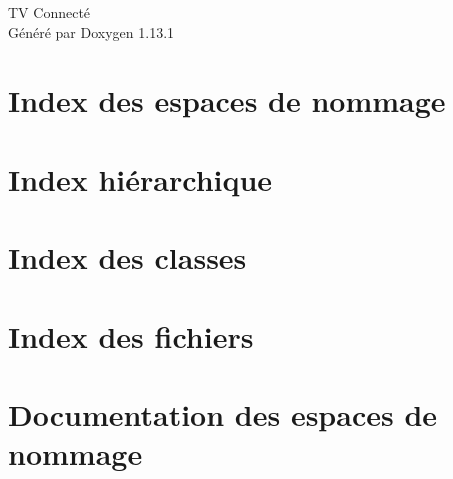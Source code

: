 \documentclass[twoside]{book}
\newcommand{\+}{\discretionary{\mbox{\scriptsize$\hookleftarrow$}}{}{}}
\newcommand{\clearemptydoublepage}{%
    \newpage{\pagestyle{empty}\cleardoublepage}%
  }
\begin{document}
  \raggedbottom
    \hypersetup{pageanchor=false,
                bookmarksnumbered=true,
                pdfencoding=unicode
               }
  \begin{titlepage}
  \vspace*{7cm}
  \begin{center}%
  {\Large TV Connecté}\\
  \vspace*{1cm}
  {\large Généré par Doxygen 1.13.1}\\
  \end{center}
  \end{titlepage}
  \clearemptydoublepage
  \tableofcontents
  \clearemptydoublepage
  \hypersetup{pageanchor=true}
\chapter{Index des espaces de nommage}

\chapter{Index hiérarchique}

\chapter{Index des classes}

\chapter{Index des fichiers}

\chapter{Documentation des espaces de nommage}









\end{document}
